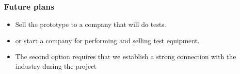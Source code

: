 \begin{frame}
	\frametitle{Future plans}
		\begin{itemize}
			\item Sell the prototype to a company that will do tests.
			\item or start a company for performing and selling test equipment.
			\item The second option requires that we establish a strong connection with the industry during the project
\end{itemize}
\end{frame}
